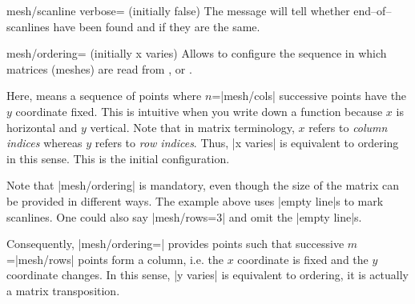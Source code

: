{\begin{pgfplotskeylist}{mesh/scanline verbose= (initially false)}
	The message will tell whether end--of--scanlines have been found and if they are the same.
\end{pgfplotskeylist}

\begin{pgfplotskey}{mesh/ordering= (initially x varies)}
	Allows to configure the sequence in which matrices (meshes) are read from ,  or .

	Here,  means a sequence of points where $n$=|mesh/cols| successive points have the $y$ coordinate fixed. This is intuitive when you write down a function because $x$ is horizontal and $y$ vertical. Note that in matrix terminology, $x$ refers to \emph{column indices} whereas $y$ refers to \emph{row indices}. Thus, |x varies| is equivalent to  ordering in this sense. This is the initial configuration.
	
\begin{codeexample}[]
\end{codeexample}
	\noindent Note that |mesh/ordering| is mandatory, even though the size of the matrix can be provided in different ways. The example above uses |empty line|s to mark scanlines. One could also say |mesh/rows=3| and omit the |empty line|s.

	Consequently, |mesh/ordering=| provides points such that successive $m$=|mesh/rows| points form a column, i.e. the $x$ coordinate is fixed and the $y$ coordinate changes. In this sense, |y varies| is equivalent to  ordering, it is actually a matrix transposition.
\begin{codeexample}[]
\end{codeexample}
\end{pgfplotskey}}
